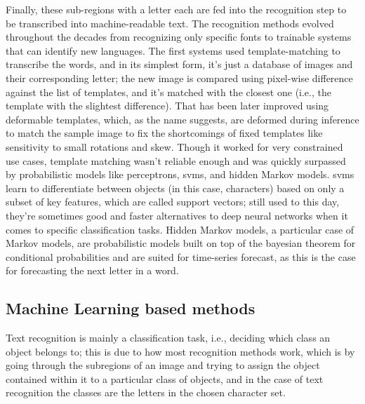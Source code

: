 Finally, these sub-regions with a letter each are fed into the recognition step to be transcribed into machine-readable text. The recognition methods evolved throughout the decades from recognizing only specific fonts to trainable systems that can identify new languages. The first systems used template-matching to transcribe the words, and in its simplest form, it's just a database of images and their corresponding letter; the new image is compared using pixel-wise difference against the list of templates, and it's matched with the closest one (i.e., the template with the slightest difference). That has been later improved using deformable templates, which, as the name suggests, are deformed during inference to match the sample image to fix the shortcomings of fixed templates like sensitivity to small rotations and skew. Though it worked for very constrained use cases, template matching wasn't reliable enough and was quickly surpassed by probabilistic models like perceptrons, \gls{svm}s, and hidden Markov models. \gls{svm}s learn to differentiate between objects (in this case, characters) based on only a subset of key features, which are called support vectors; still used to this day, they're sometimes good and faster alternatives to deep neural networks when it comes to specific classification tasks. Hidden Markov models, a particular case of Markov models, are probabilistic models built on top of the bayesian theorem for conditional probabilities and are suited for time-series forecast, as this is the case for forecasting the next letter in a word.

\subsection{Machine Learning based methods}

Text recognition is mainly a classification task, i.e., deciding which class an object belongs to; this is due to how most recognition methods work, which is by going through the subregions of an image and trying to assign the object contained within it to a particular class of objects, and in the case of text recognition the classes are the letters in the chosen character set.


